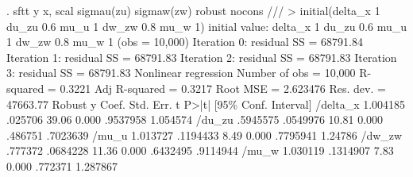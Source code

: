 . sftt y x, scal sigmau(zu) sigmaw(zw) robust nocons ///
>          initial(delta_x 1 du_zu 0.6 mu_u 1 dw_zw 0.8 mu_w 1)
initial value: delta_x 1 du_zu 0.6 mu_u 1 dw_zw 0.8 mu_w 1
(obs = 10,000)
{\smallskip}
Iteration 0:  residual SS =  68791.84
Iteration 1:  residual SS =  68791.83
Iteration 2:  residual SS =  68791.83
Iteration 3:  residual SS =  68791.83
{\smallskip}
{\smallskip}
Nonlinear regression                                Number of obs =     10,000
                                                    R-squared     =     0.3221
                                                    Adj R-squared =     0.3217
                                                    Root MSE      =   2.623476
                                                    Res. dev.     =   47663.77
{\smallskip}
{}
             {\VBAR}               Robust
           y {\VBAR}      Coef.   Std. Err.      t    P>|t|     [95\% Conf. Interval]
    /delta_x {\VBAR}   1.004185    .025706    39.06   0.000     .9537958    1.054574
      /du_zu {\VBAR}   .5945575   .0549976    10.81   0.000      .486751    .7023639
       /mu_u {\VBAR}   1.013727   .1194433     8.49   0.000     .7795941     1.24786
      /dw_zw {\VBAR}    .777372   .0684228    11.36   0.000     .6432495    .9114944
       /mu_w {\VBAR}   1.030119   .1314907     7.83   0.000      .772371    1.287867
